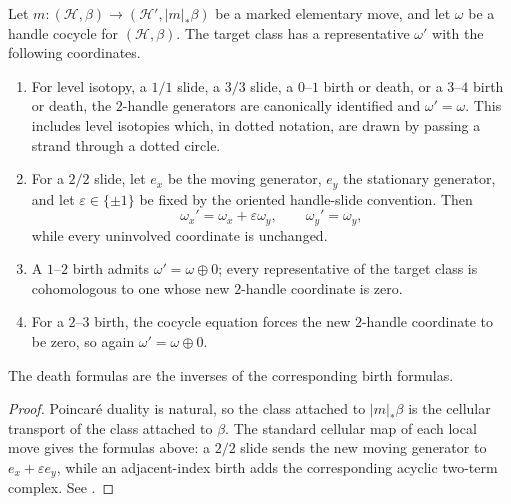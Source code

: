 \begin{proposition}
\label{prop:marking-coordinate-transport}
Let \(m\colon(\mathcal H,\beta)\to
(\mathcal H',|m|_*\beta)\) be a marked elementary move, and let \(\omega\)
be a handle cocycle for \((\mathcal H,\beta)\).  The target class has a
representative \(\omega'\) with the following coordinates.
\begin{enumerate}[label=(\roman*),ref=\roman*]
  \item For level isotopy, a \(1/1\) slide, a \(3/3\) slide, a
  \(0\)--\(1\) birth or death, or a \(3\)--\(4\) birth or death, the
  \(2\)-handle generators are canonically identified and
  \(\omega'=\omega\).  This includes level isotopies which, in dotted
  notation, are drawn by passing a strand through a dotted circle.

  \item For a \(2/2\) slide, let \(e_x\) be the moving generator,
  \(e_y\) the stationary generator, and let
  \(\varepsilon\in\{\pm1\}\) be fixed by the oriented handle-slide
  convention.  Then
  \begin{equation}
    \omega_x'=\omega_x+\varepsilon\omega_y,
    \qquad
    \omega_y'=\omega_y,
    \label{eq:two-two-marking-transport}
  \end{equation}
  while every uninvolved coordinate is unchanged.

  \item A \(1\)--\(2\) birth admits \(\omega'=\omega\oplus0\); every
  representative of the target class is cohomologous to one whose new
  \(2\)-handle coordinate is zero.

  \item For a \(2\)--\(3\) birth, the cocycle equation forces the new
  \(2\)-handle coordinate to be zero, so again
  \(\omega'=\omega\oplus0\).
\end{enumerate}
The death formulas are the inverses of the corresponding birth formulas.
\end{proposition}

\begin{proof}
Poincar\'e duality is natural, so the class attached to \(|m|_*\beta\) is
the cellular transport of the class attached to \(\beta\).  The standard
cellular map of each local move gives the formulas above: a \(2/2\) slide
sends the new moving generator to \(e_x+\varepsilon e_y\), while an
adjacent-index birth adds the corresponding acyclic two-term complex.  See
\cite[Sections~4.1--4.2]{DurstGeigesKegel2019}.
\end{proof}

